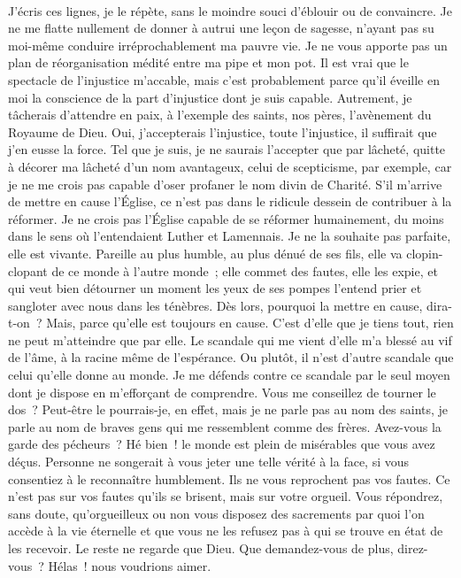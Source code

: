 \documentclass[french,twoside]{book} %
\newcommand{\astertri}{\medskip\par\centerline{\color{rubric}\large\selectfont{\syms ✻\,✻\,✻}}\medskip\par}%
\begin{document}
\astertri

\noindent  \par
J’écris ces lignes, je le répète, sans le moindre souci d’éblouir ou de convaincre. Je ne me flatte nullement de donner à autrui une leçon de sagesse, n’ayant pas su moi-même conduire irréprochablement ma pauvre vie. Je ne vous apporte pas un plan de réorganisation médité entre ma pipe et mon pot. Il est vrai que le spectacle de l’injustice m’accable, mais c’est probablement parce qu’il éveille en moi la conscience de la part d’injustice dont je suis capable. Autrement, je tâcherais d’attendre en paix, à l’exemple des saints, nos pères, l’avènement du Royaume de Dieu. Oui, j’accepterais l’injustice, toute l’injustice, il suffirait que j’en eusse la force. Tel que je suis, je ne saurais l’accepter que par lâcheté, quitte à décorer ma lâcheté d’un nom avantageux, celui de scepticisme, par exemple, car je ne me crois pas capable d’oser profaner le nom divin de Charité. S’il m’arrive de mettre en cause l’Église, ce n’est pas dans le ridicule dessein de contribuer à la réformer. Je ne crois pas l’Église capable de se réformer humainement, du moins dans le sens où l’entendaient Luther et Lamennais. Je ne la souhaite pas parfaite, elle est vivante. Pareille au plus humble, au plus dénué de ses fils, elle va clopin-clopant de ce monde à l’autre monde ; elle commet des fautes, elle les expie, et qui veut bien détourner un moment les yeux de ses pompes l’entend prier et sangloter avec nous dans les ténèbres. Dès lors, pourquoi la mettre en cause, dira-t-on ? Mais, parce qu’elle est toujours en cause. C’est d’elle que je tiens tout, rien ne peut m’atteindre que par elle. Le scandale qui me vient d’elle m’a blessé au vif de l’âme, à la racine même de l’espérance. Ou plutôt, il n’est d’autre scandale que celui qu’elle donne au monde. Je me défends contre ce scandale par le seul moyen dont je dispose en m’efforçant de comprendre. Vous me conseillez de tourner le dos ? Peut-être le pourrais-je, en effet, mais je ne parle pas au nom des saints, je parle au nom de braves gens qui me ressemblent comme des frères. Avez-vous la garde des pécheurs ? Hé bien ! le monde est plein de misérables que vous avez déçus. Personne ne songerait à vous jeter une telle vérité à la face, si vous consentiez à le reconnaître humblement. Ils ne vous reprochent pas vos fautes. Ce n’est pas sur vos fautes qu’ils se brisent, mais sur votre orgueil. Vous répondrez, sans doute, qu’orgueilleux ou non vous disposez des sacrements par quoi l’on accède à la vie éternelle et que vous ne les refusez pas à qui se trouve en état de les recevoir. Le reste ne regarde que Dieu. Que demandez-vous de plus, direz-vous ? Hélas ! nous voudrions aimer.
\end{document}
